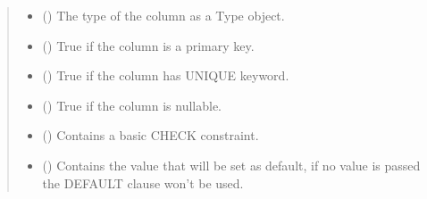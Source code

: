 \documentclass[letterpaper,10pt,english]{sphinxmanual}
\begin{document}
\begin{fulllineitems}
\begin{quote}
\begin{description}
\begin{itemize}
\item {} 
\sphinxAtStartPar
{} ({\hyperref[\detokenize{model:simple_sql.model.type.Type}]{}}) \textendash{} The type of the column as a Type object.

\item {} 
\sphinxAtStartPar
{} (\sphinxstyleliteralemphasis{\sphinxupquote{, }}) \textendash{} True if the column is a primary key.

\item {} 
\sphinxAtStartPar
{} (\sphinxstyleliteralemphasis{\sphinxupquote{, }}) \textendash{} True if the column has UNIQUE keyword.

\item {} 
\sphinxAtStartPar
{} (\sphinxstyleliteralemphasis{\sphinxupquote{, }}) \textendash{} True if the column is nullable.

\item {} 
\sphinxAtStartPar
{} (\sphinxstyleliteralemphasis{\sphinxupquote{, }}) \textendash{} Contains a basic CHECK constraint.

\item {} 
\sphinxAtStartPar
{} (\sphinxstyleliteralemphasis{\sphinxupquote{, }}) \textendash{} Contains the value that will be set as default, if no value
is passed the DEFAULT clause won’t be used.

\end{itemize}

\end{description}\end{quote}


\end{fulllineitems}
\end{document}

